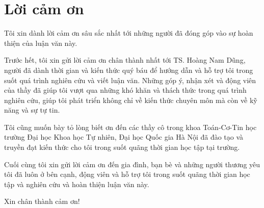 \chapter*{Lời cảm ơn}
Tôi xin dành lời cảm ơn sâu sắc nhất tới những người đã đóng góp vào sự hoàn thiện của luận văn này.

Trước hết, tôi xin gửi lời cảm ơn chân thành nhất tới TS. Hoàng Nam Dũng, người đã dành thời gian và kiến thức quý báu để hướng dẫn và hỗ trợ tôi trong suốt quá trình nghiên cứu và viết luận văn. Những góp ý, nhận xét và động viên của thầy đã giúp tôi vượt qua những khó khăn và thách thức trong quá trình nghiên cứu, giúp tôi phát triển không chỉ về kiến thức chuyên môn mà còn về kỹ năng và sự tự tin.

Tôi cũng muốn bày tỏ lòng biết ơn đến các thầy cô trong khoa Toán-Cơ-Tin học trường Đại học Khoa học Tự nhiên, Đại học Quốc gia Hà Nội đã đào tạo và truyền đạt kiến thức cho tôi trong suốt quãng thời gian học tập tại trường.

Cuối cùng tôi xin gửi lời cảm ơn đến gia đình, bạn bè và những người thương yêu tôi đã luôn ở bên cạnh, động viên và hỗ trợ tôi trong suốt quãng thời gian học tập và nghiên cứu và hoàn thiện luận văn này.

Xin chân thành cảm ơn!